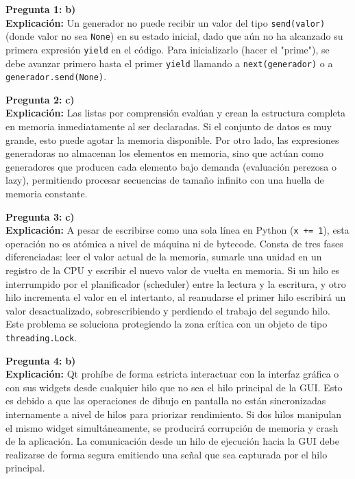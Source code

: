 \documentclass[12pt,letterpaper]{article}
\begin{document}
\textbf{Pregunta 1:} \textbf{b)} \\
\textbf{Explicación:} Un generador no puede recibir un valor del tipo \texttt{send(valor)} (donde valor no sea \texttt{None}) en su estado inicial, dado que aún no ha alcanzado su primera expresión \texttt{yield} en el código. Para inicializarlo (hacer el "prime"), se debe avanzar primero hasta el primer \texttt{yield} llamando a \texttt{next(generador)} o a \texttt{generador.send(None)}.

\medskip

\textbf{Pregunta 2:} \textbf{c)} \\
\textbf{Explicación:} Las listas por comprensión evalúan y crean la estructura completa en memoria inmediatamente al ser declaradas. Si el conjunto de datos es muy grande, esto puede agotar la memoria disponible. Por otro lado, las expresiones generadoras no almacenan los elementos en memoria, sino que actúan como generadores que producen cada elemento bajo demanda (evaluación perezosa o lazy), permitiendo procesar secuencias de tamaño infinito con una huella de memoria constante.

\medskip

\textbf{Pregunta 3:} \textbf{c)} \\
\textbf{Explicación:} A pesar de escribirse como una sola línea en Python (\texttt{x += 1}), esta operación no es atómica a nivel de máquina ni de bytecode. Consta de tres fases diferenciadas: leer el valor actual de la memoria, sumarle una unidad en un registro de la CPU y escribir el nuevo valor de vuelta en memoria. Si un hilo es interrumpido por el planificador (scheduler) entre la lectura y la escritura, y otro hilo incrementa el valor en el intertanto, al reanudarse el primer hilo escribirá un valor desactualizado, sobrescribiendo y perdiendo el trabajo del segundo hilo. Este problema se soluciona protegiendo la zona crítica con un objeto de tipo \texttt{threading.Lock}.

\medskip

\textbf{Pregunta 4:} \textbf{b)} \\
\textbf{Explicación:} Qt prohíbe de forma estricta interactuar con la interfaz gráfica o con sus widgets desde cualquier hilo que no sea el hilo principal de la GUI. Esto es debido a que las operaciones de dibujo en pantalla no están sincronizadas internamente a nivel de hilos para priorizar rendimiento. Si dos hilos manipulan el mismo widget simultáneamente, se producirá corrupción de memoria y crash de la aplicación. La comunicación desde un hilo de ejecución hacia la GUI debe realizarse de forma segura emitiendo una señal que sea capturada por el hilo principal.
\end{document}
